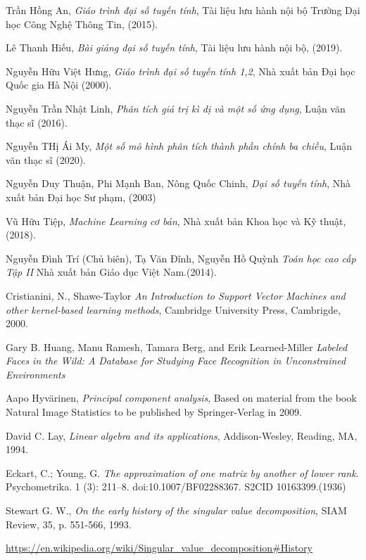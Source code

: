 \documentclass[12pt,a4paper,oneside]{report}
\numberwithin{equation}{section}
\begin{document}
\begin{thebibliography}{99}
Trần Hồng An,
\emph{Giáo trình đại số tuyến tính},
Tài liệu lưu hành nội bộ Trường Dại học Công Nghệ Thông Tin, (2015).

Lê Thanh Hiếu,
\emph{Bài giảng đại số tuyến tính},
Tài liệu lưu hành nội bộ, (2019).

Nguyễn Hữu Việt Hưng,
\emph{Giáo trình đại số tuyến tính 1,2},
Nhà xuất bản Đại học Quốc gia Hà Nội (2000).

Nguyễn Trần Nhật Linh,
\emph{Phân tích giá trị kì dị và một số ứng dụng},
Luận văn thạc sĩ (2016).

Nguyễn THị Ái My,
\emph{Một số mô hình phân tích thành phần chính ba chiều},
Luận văn thạc sĩ (2020).

Nguyễn Duy Thuận, Phi Mạnh Ban, Nông Quốc Chinh,
\emph{Dại số tuyến tính},
Nhà xuất bản Đại học Sư phạm, (2003)

Vũ Hữu Tiệp,
\emph{Machine Learning cơ bản},
Nhà xuất bản Khoa học và Kỹ thuật, (2018).

Nguyễn Đình Trí (Chủ biên), Tạ Văn Đĩnh, Nguyễn Hồ Quỳnh
\emph{Toán học cao cấp Tập II}
 Nhà xuất bản Giáo dục Việt Nam.(2014).

Cristianini, N., Shawe-Taylor
\emph{An Introduction to Support Vector Machines and other kernel-based learning methods},
Cambridge University Press, Cambrigde, 2000.

Gary B. Huang, Manu Ramesh, Tamara Berg, and Erik Learned-Miller
\emph{Labeled Faces in the Wild: A Database for Studying
Face Recognition in Unconstrained Environments}

Aapo Hyvärinen,
\emph{Principal component analysis},
Based on material from the book Natural Image Statistics to be published by Springer-Verlag in 2009.



David C. Lay,
\emph{Linear algebra and its applications},
Addison-Wesley, Reading, MA, 1994.

Eckart, C.; Young, G.
\emph{ The approximation of one matrix by another of lower rank}. Psychometrika. 1 (3): 211–8. doi:10.1007/BF02288367. S2CID 10163399.(1936)




Stewart G. W.,
\emph{On the early history of the singular value decomposition},
SIAM Review, 35, p. 551-566, 1993.


\url{https://en.wikipedia.org/wiki/Singular_value_decomposition#History}
	\end{thebibliography}
\end{document}
